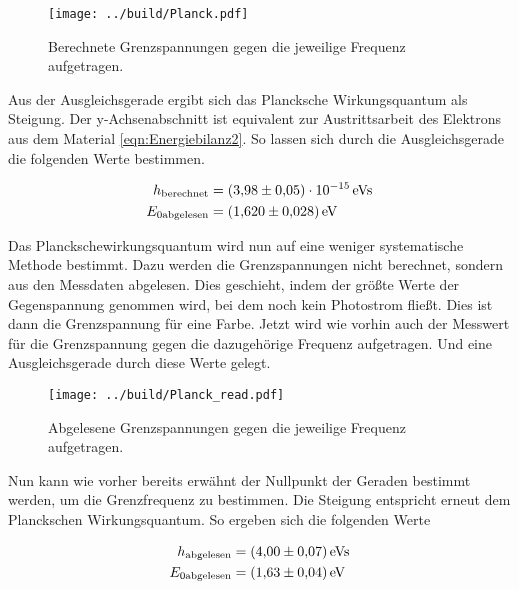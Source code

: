 \begin{figure}[H]
    \centering
    \texttt{[image: ../build/Planck.pdf]}
    \caption{Berechnete Grenzspannungen gegen die jeweilige Frequenz aufgetragen.}
\end{figure}

\noindent Aus der Ausgleichsgerade ergibt sich das Plancksche Wirkungsquantum als Steigung. Der y-Achsenabschnitt ist equivalent zur 
Austrittsarbeit des Elektrons aus dem Material \ref{eqn:Energiebilanz2}. So lassen sich durch die Ausgleichsgerade die folgenden Werte 
bestimmen.

\begin{align}
    h_\text{berechnet} &=\qty{3.98\pm0.05 e-15}{e \volt \second} \\
    E_{0 \text{abgelesen}} &= \qty{1.620 \pm 0.028}{e \volt}
\end{align}

\noindent Das Planckschewirkungsquantum wird nun auf eine weniger systematische Methode bestimmt. Dazu werden die Grenzspannungen nicht 
berechnet, sondern aus den Messdaten abgelesen. Dies geschieht, indem der größte Werte der Gegenspannung genommen wird, bei dem noch kein 
Photostrom fließt. Dies ist dann die Grenzspannung für eine Farbe. Jetzt wird wie vorhin auch der Messwert für die Grenzspannung gegen die 
dazugehörige Frequenz aufgetragen. Und eine Ausgleichsgerade durch diese Werte gelegt.

\begin{figure}
    \centering
    \texttt{[image: ../build/Planck\_read.pdf]}
    \caption{Abgelesene Grenzspannungen gegen die jeweilige Frequenz aufgetragen.}
\end{figure}

\noindent Nun kann wie vorher bereits erwähnt der Nullpunkt der Geraden bestimmt werden, um die Grenzfrequenz zu bestimmen. Die Steigung 
entspricht erneut dem Planckschen Wirkungsquantum. So ergeben sich die folgenden Werte

\begin{align}
    h_\text{abgelesen} &= \qty{4.00 \pm 0.07}{e \volt \second}\\
    E_{0 \text{abgelesen}} &= \qty{1.63 \pm 0.04}{e \volt}
\end{align}



















